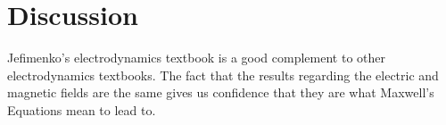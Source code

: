 \documentclass[11pt]{article}              %
\begin{document}







\section{Discussion}
Jefimenko's electrodynamics textbook is a good complement to other electrodynamics textbooks. The fact that the results regarding the electric and magnetic fields are the same gives us confidence that they are what Maxwell's Equations mean to lead to.
\end{document}
